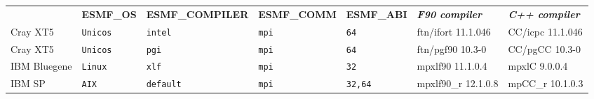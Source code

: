 \begin{tabular}{lllllll}
  &{\bfseries\footnotesize ESMF\_OS} &{\bfseries\footnotesize ESMF\_COMPILER} & {\bfseries\footnotesize ESMF\_COMM} & {\bfseries\footnotesize ESMF\_ABI} &
  {\bfseries\footnotesize\it F90 compiler} & {\bfseries\footnotesize\it C++ compiler} \\

Cray XT5              &\tt Unicos &\tt intel        &\tt mpi        &\tt 64              & ftn/ifort \footnotesize 11.1.046   & CC/icpc \footnotesize 11.1.046  \\ %
Cray XT5              &\tt Unicos &\tt pgi          &\tt mpi        &\tt 64              & ftn/pgf90 \footnotesize 10.3-0     & CC/pgCC \footnotesize 10.3-0    \\ %
IBM Bluegene          &\tt Linux  &\tt xlf          &\tt mpi        &\tt 32              & mpxlf90 \footnotesize 11.1.0.4     & mpxlC \footnotesize 9.0.0.4     \\ %
IBM SP                &\tt AIX    &\tt default      &\tt mpi        &\tt 32,64           & mpxlf90\_r \footnotesize 12.1.0.8  & mpCC\_r \footnotesize 10.1.0.3  \\ %

\end{tabular}
